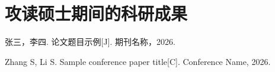 \chapter{攻读硕士期间的科研成果}

\begin{enumerate}[label={[\arabic*]},leftmargin=2em]
  \item 张三，李四. 论文题目示例[J]. 期刊名称，2026.
  \item Zhang S, Li S. Sample conference paper title[C]. Conference Name, 2026.
\end{enumerate}
